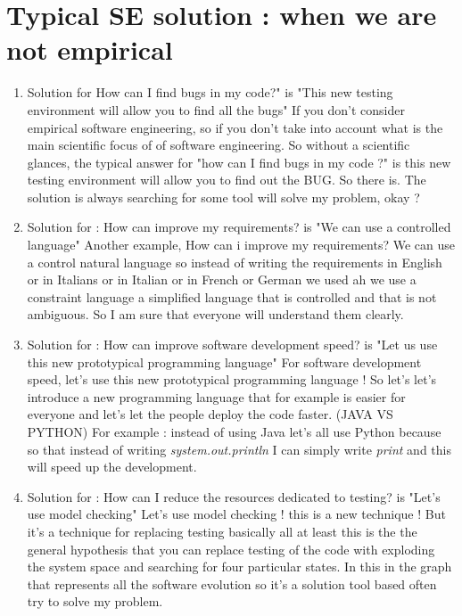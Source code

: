 \documentclass[conference, compsoc, twoside]{IEEEtran}
\begin{document}
\section{Typical SE solution : when we are not empirical} %
\begin{enumerate}
\item Solution for How can I find bugs in my code?" is "This new testing environment will allow you to find all the bugs"
If you don't consider empirical software engineering, so if you don't take into account what is the main scientific focus of of software engineering. So without a scientific glances, the typical answer for "how can I find bugs in my code ?" is this new testing environment will allow you to find out the BUG. So there is. 
The solution is always searching for some tool will solve my problem, okay ?
\item Solution for : How can improve my requirements? is "We can use a controlled language"
Another example, How can i improve my requirements? 
We can use a control natural language so instead of writing the requirements in English or in Italians or in Italian or in French or German we used ah we use a constraint language a simplified language that is controlled and that is not ambiguous. 
So I am sure that everyone will understand them clearly.

\item Solution for : How can improve software development speed? is "Let us use this new prototypical programming language"
For software development speed, let's use this new prototypical programming language !
So let's let's introduce a new programming language that for example is easier for everyone and let's let the people deploy the code faster. 
(JAVA VS PYTHON)
For example : instead of using Java let's all use Python because so that instead of writing \textit{system.out.println} I can simply write \textit{print} and this will speed up the development.

\item Solution for : How can I reduce the resources dedicated to testing? is "Let’s use model checking"
Let's use model checking ! this is a new technique ! 
But it's a technique for replacing testing basically all at least this is the the general hypothesis that you can replace testing of the code with exploding the system space and searching for four particular states.
In this in the graph that represents all the software evolution so it's a solution tool based often try to solve my problem.
	
\end{enumerate}
\end{document}
